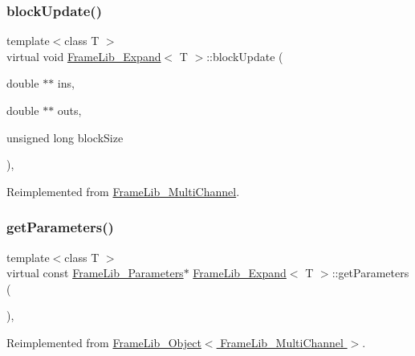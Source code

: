 \subsubsection{\texorpdfstring{block\+Update()}{blockUpdate()}}
{\footnotesize\ttfamily template$<$class T $>$ \\
virtual void \hyperlink{class_frame_lib___expand}{Frame\+Lib\+\_\+\+Expand}$<$ T $>$\+::block\+Update (\begin{DoxyParamCaption}\item[{double $\ast$$\ast$}]{ins,  }\item[{double $\ast$$\ast$}]{outs,  }\item[{unsigned long}]{block\+Size }\end{DoxyParamCaption})\hspace{0.3cm}{\ttfamily [inline]}, {\ttfamily [virtual]}}



Reimplemented from \hyperlink{class_frame_lib___multi_channel_a8ad8f1c0138f32ef0bfb7e4673b34d30}{Frame\+Lib\+\_\+\+Multi\+Channel}.

\mbox{\label{class_frame_lib___expand_a89b4ff711b3b2772ee3ac7a6774261fb}} 
\subsubsection{\texorpdfstring{get\+Parameters()}{getParameters()}}
{\footnotesize\ttfamily template$<$class T $>$ \\
virtual const \hyperlink{class_frame_lib___parameters}{Frame\+Lib\+\_\+\+Parameters}$\ast$ \hyperlink{class_frame_lib___expand}{Frame\+Lib\+\_\+\+Expand}$<$ T $>$\+::get\+Parameters (\begin{DoxyParamCaption}{ }\end{DoxyParamCaption})\hspace{0.3cm}{\ttfamily [inline]}, {\ttfamily [virtual]}}



Reimplemented from \hyperlink{class_frame_lib___object_aaebb53211e0617e9203d1088c2fcb9c2}{Frame\+Lib\+\_\+\+Object$<$ Frame\+Lib\+\_\+\+Multi\+Channel $>$}.

\mbox{\label{class_frame_lib___expand_a77c0e4af675ebb2ac3f47b26939ab94b}} 
